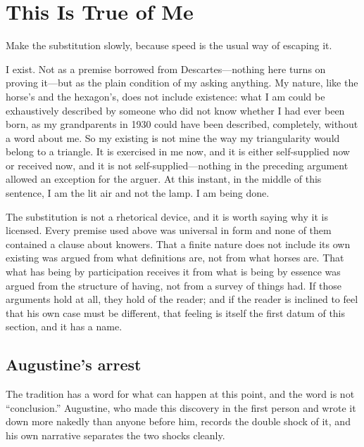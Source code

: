 \section{This Is True of Me}

Make the substitution slowly, because speed is the usual way of escaping it.

I exist. Not as a premise borrowed from Descartes---nothing here turns on proving it---but as the plain condition of my asking anything. My nature, like the horse's and the hexagon's, does not include existence: what I am could be exhaustively described by someone who did not know whether I had ever been born, as my grandparents in 1930 could have been described, completely, without a word about me. So my existing is not mine the way my triangularity would belong to a triangle. It is exercised in me now, and it is either self-supplied now or received now, and it is not self-supplied---nothing in the preceding argument allowed an exception for the arguer. At this instant, in the middle of this sentence, I am the lit air and not the lamp. I am being done.

The substitution is not a rhetorical device, and it is worth saying why it is licensed. Every premise used above was universal in form and none of them contained a clause about knowers. That a finite nature does not include its own existing was argued from what definitions are, not from what horses are. That what has being by participation receives it from what is being by essence was argued from the structure of having, not from a survey of things had. If those arguments hold at all, they hold of the reader; and if the reader is inclined to feel that his own case must be different, that feeling is itself the first datum of this section, and it has a name.

\subsection{Augustine's arrest}

The tradition has a word for what can happen at this point, and the word is not ``conclusion.'' Augustine, who made this discovery in the first person and wrote it down more nakedly than anyone before him, records the double shock of it, and his own narrative separates the two shocks cleanly.

